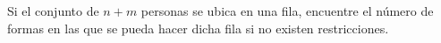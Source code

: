 Si el conjunto de \(n+m\) personas se ubica en una fila, encuentre el número de formas en las que se pueda hacer dicha fila si no existen restricciones.
